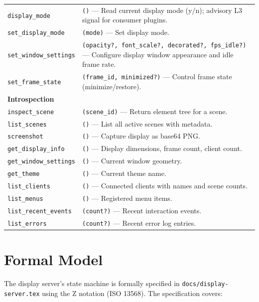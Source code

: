 \documentclass[a4paper,10pt]{article}
\newcommand{\tool}[1]{\texttt{#1}}
\begin{document}
\begin{center}
\begin{longtable}{lp{8cm}}
\midrule
\tool{display\_mode}  & \texttt{()} --- Read current display mode
  (y/n); advisory L3 signal for consumer plugins. \\
\tool{set\_display\_mode} & \texttt{(mode)} --- Set display mode. \\
\tool{set\_window\_settings} & \texttt{(opacity?, font\_scale?,
  decorated?, fps\_idle?)} --- Configure display window appearance
  and idle frame rate. \\
\tool{set\_frame\_state} & \texttt{(frame\_id, minimized?)}
  --- Control frame state (minimize/restore). \\
\midrule
\multicolumn{2}{l}{\textbf{Introspection}} \\
\midrule
\tool{inspect\_scene} & \texttt{(scene\_id)} --- Return element tree
  for a scene. \\
\tool{list\_scenes}   & \texttt{()} --- List all active scenes with
  metadata. \\
\tool{screenshot}     & \texttt{()} --- Capture display as base64
  PNG. \\
\tool{get\_display\_info} & \texttt{()} --- Display dimensions,
  frame count, client count. \\
\tool{get\_window\_settings} & \texttt{()} --- Current window
  geometry. \\
\tool{get\_theme}     & \texttt{()} --- Current theme name. \\
\tool{list\_clients}  & \texttt{()} --- Connected clients with
  names and scene counts. \\
\tool{list\_menus}    & \texttt{()} --- Registered menu items. \\
\tool{list\_recent\_events} & \texttt{(count?)} --- Recent
  interaction events. \\
\tool{list\_errors}   & \texttt{(count?)} --- Recent error log
  entries. \\
\bottomrule
\end{longtable}
\end{center}

\section{Formal Model}

The display server's state machine is formally specified in
\texttt{docs/display-server.tex} using the Z notation (ISO 13568).
The specification covers:
\end{document}
